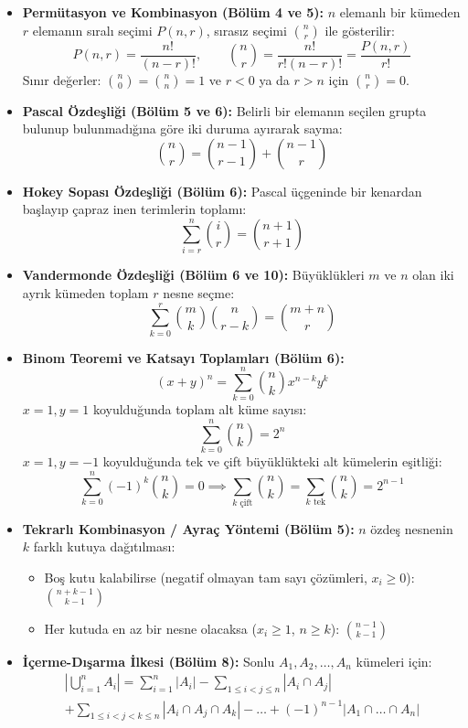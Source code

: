 \begin{itemize}
    \item \textbf{Permütasyon ve Kombinasyon (Bölüm 4 ve 5):}
    $n$ elemanlı bir kümeden $r$ elemanın sıralı seçimi $P(n,r)$, sırasız seçimi $\binom{n}{r}$ ile gösterilir:
    \[
    P(n,r) = \frac{n!}{(n-r)!}, \qquad \binom{n}{r} = \frac{n!}{r!(n-r)!} = \frac{P(n,r)}{r!}
    \]
    Sınır değerler: $\binom{n}{0} = \binom{n}{n} = 1$ ve $r < 0$ ya da $r > n$ için $\binom{n}{r} = 0$.

    \item \textbf{Pascal Özdeşliği (Bölüm 5 ve 6):}
    Belirli bir elemanın seçilen grupta bulunup bulunmadığına göre iki duruma ayırarak sayma:
    \[
    \binom{n}{r} = \binom{n-1}{r-1} + \binom{n-1}{r}
    \]

    \item \textbf{Hokey Sopası Özdeşliği (Bölüm 6):}
    Pascal üçgeninde bir kenardan başlayıp çapraz inen terimlerin toplamı:
    \[
    \sum_{i=r}^{n} \binom{i}{r} = \binom{n+1}{r+1}
    \]

    \item \textbf{Vandermonde Özdeşliği (Bölüm 6 ve 10):}
    Büyüklükleri $m$ ve $n$ olan iki ayrık kümeden toplam $r$ nesne seçme:
    \[
    \sum_{k=0}^{r} \binom{m}{k}\binom{n}{r-k} = \binom{m+n}{r}
    \]

    \item \textbf{Binom Teoremi ve Katsayı Toplamları (Bölüm 6):}
    \[
    (x+y)^n = \sum_{k=0}^{n} \binom{n}{k} x^{n-k} y^k
    \]
    $x=1, y=1$ koyulduğunda toplam alt küme sayısı:
    \[
    \sum_{k=0}^{n} \binom{n}{k} = 2^n
    \]
    $x=1, y=-1$ koyulduğunda tek ve çift büyüklükteki alt kümelerin eşitliği:
    \[
    \sum_{k=0}^{n} (-1)^k \binom{n}{k} = 0 \implies \sum_{k \text{ çift}} \binom{n}{k} = \sum_{k \text{ tek}} \binom{n}{k} = 2^{n-1}
    \]

    \item \textbf{Tekrarlı Kombinasyon / Ayraç Yöntemi (Bölüm 5):}
    $n$ özdeş nesnenin $k$ farklı kutuya dağıtılması:
    \begin{itemize}
        \item Boş kutu kalabilirse (negatif olmayan tam sayı çözümleri, $x_i \ge 0$): $\binom{n+k-1}{k-1}$
        \item Her kutuda en az bir nesne olacaksa ($x_i \ge 1$, $n \ge k$): $\binom{n-1}{k-1}$
    \end{itemize}

    \item \textbf{İçerme-Dışarma İlkesi (Bölüm 8):}
    Sonlu $A_1, A_2, \dots, A_n$ kümeleri için:
    \begin{multline*}
    \left| \bigcup_{i=1}^n A_i \right| = \sum_{i=1}^n |A_i| - \sum_{1 \le i < j \le n} |A_i \cap A_j| \\
    + \sum_{1 \le i < j < k \le n} |A_i \cap A_j \cap A_k| - \dots + (-1)^{n-1} |A_1 \cap \dots \cap A_n|
    \end{multline*}


\end{itemize}
